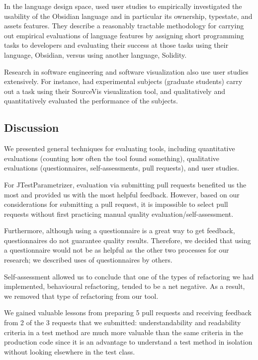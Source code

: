 In the language design space,  used user studies to empirically
investigated the usability of the Obsidian language and in particular
its ownership, typestate, and assets features. They describe a
reasonably tractable methodology for carrying out empirical
evaluations of language features by assigning short programming tasks
to developers and evaluating their success at those tasks using their
language, Obsidian, versus using another language, Solidity.

Research in software engineering and software visualization also use
user studies extensively.  For instance,  had
experimental subjects (graduate students) carry out a task using their
SourceVis visualization tool, and qualitatively and quantitatively
evaluated the performance of the subjects.


\subsection{Discussion}
We presented general techniques for evaluating tools, including
quantitative evaluations (counting how often the tool found something),
qualitative evaluations (questionnaires, self-assessments, pull requests),
and user studies.

For JTestParametrizer, evaluation via submitting pull requests benefited us the most and provided us with the most helpful feedback. However, based on our considerations for submitting a pull request, it is impossible to select pull requests without first practicing manual quality evaluation/self-assessment.

Furthermore, although using a questionnaire is a great way to get feedback, questionnaires do not guarantee quality results. Therefore, we decided that using a questionnaire would not be as helpful as the other two processes for our research; we described uses of questionnaires by others.

Self-assessment allowed us to conclude that one of the types of refactoring we had implemented, behavioural refactoring, tended to be a net negative. As a result, we removed that type of refactoring from our tool.

We gained valuable lessons from preparing 5 pull requests and receiving feedback from 2 of the 3 requests that we submitted: understandability and readability criteria in a test method are much more valuable than the same criteria in the production code since it is an advantage to understand a test method in isolation without looking elsewhere in the test class. 

